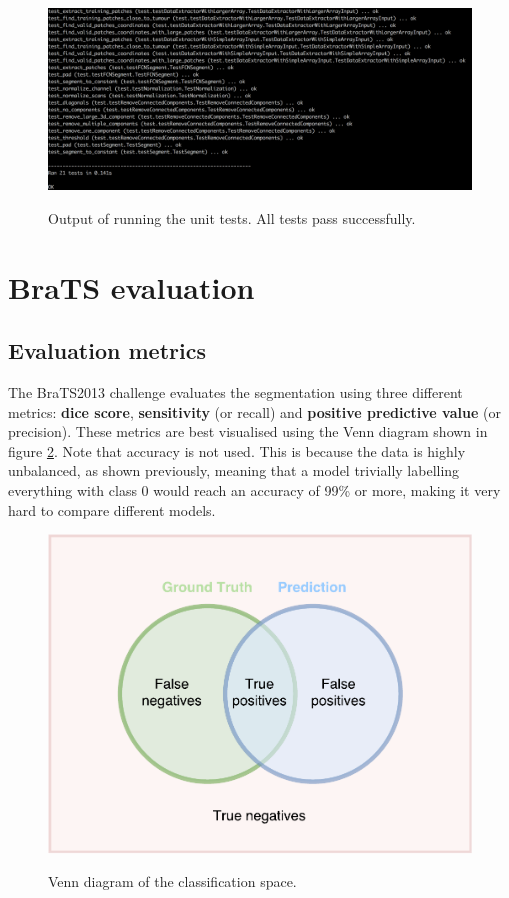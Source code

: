 \documentclass[12pt,a4paper,twoside,openright]{report}
\begin{document}
\begin{figure}[h]
	\centering
	\includegraphics[width = \textwidth]{unit_test_output}
	\label{fig:unit_test_output}
	\caption{Output of running the unit tests. All tests pass successfully.}
\end{figure}

\section{BraTS evaluation}
\subsection{Evaluation metrics}
The BraTS2013 challenge \cite{brats-proceedings} evaluates the segmentation using three different metrics: \textbf{dice score}, \textbf{sensitivity} (or recall) and \textbf{positive predictive value} (or precision). These metrics are best visualised using the Venn diagram shown in figure \ref{fig:evaluation_venn_diagram}.  Note that accuracy is not used. This is because the data is highly unbalanced, as shown previously, meaning that a model trivially labelling everything with class 0 would reach an accuracy of 99\% or more, making it very hard to compare different models.

\begin{figure}
	\centering
	\includegraphics[scale = 0.5]{evaluation_venn_diagram}
	\label{fig:evaluation_venn_diagram}
	\caption{Venn diagram of the classification space.}
\end{figure}
\end{document}
